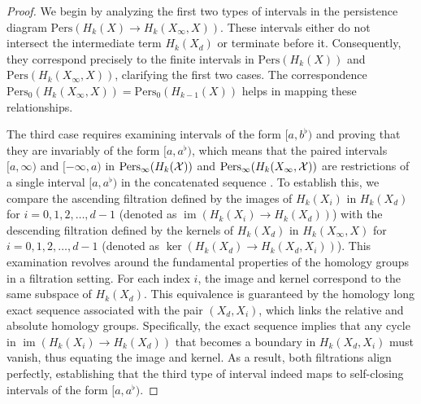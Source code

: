 \begin{proof}
	We begin by analyzing the first two types of intervals in the persistence diagram
	$\mathrm{Pers}(H_{k}(X) \to H_{k}(X_{\infty}, X))$. These intervals either do
	not intersect the intermediate term $H_{k}(X_{d})$ or terminate before it. Consequently,
	they correspond precisely to the finite intervals in $\mathrm{Pers}(H_{k}(X))$
	and $\mathrm{Pers}(H_{k}(X_{\infty}, X))$, clarifying the first two cases. The
	correspondence $\mathrm{Pers}_{0}(H_{k}(X_{\infty}, X)) = \mathrm{Pers}_{0}(H_{k-1}(X))$
	helps in mapping these relationships.

	The third case requires examining intervals of the form $[a, b^{\flat})$ and
	proving that they are invariably of the form $[a, a^{\flat})$, which means that
	the paired intervals $[a,\infty)$ and $[-\infty,a)$ in $\mathrm{Pers}_{\infty}(
	H_{k}({\mathcal{X}}))$ and $\mathrm{Pers}_{\infty}(H_{k}(X_{\infty}, {\mathcal{X}}))$ are restrictions
	of a single interval $[a,a^{\flat})$ in the concatenated sequence \cite[Proposition 2.5, proof]{de2011dualities}.
	To establish this, we compare the ascending filtration defined by the images of
	$H_{k}(X_{i})$ in $H_{k}(X_{d})$ for $i = 0, 1, 2, \ldots, d-1$ (denoted as
	$\operatorname{im}(H_{k}(X_{i}) \to H_{k}(X_{d}))$) with the descending filtration defined
	by the kernels of $H_{k}(X_{d})$ in $H_{k}(X_{\infty}, X)$ for $i = 0, 1, 2, \ldots
	, d-1$ (denoted as $\ker(H_{k}(X_{d}) \to H_{k}(X_{d}, X_{i}))$). This
	examination revolves around the fundamental properties of the homology groups
	in a filtration setting. For each index $i$, the image and kernel correspond to the same subspace of $H_{k}
	(X_{d})$. This equivalence is guaranteed by the homology long exact sequence
	associated with the pair $(X_{d}, X_{i})$, which links the relative and absolute
	homology groups. Specifically, the exact sequence implies that any cycle in $\operatorname{im}
	(H_{k}(X_{i}) \to H_{k}(X_{d}))$ that becomes a boundary in $H_{k}(X_{d}, X_{i}
	)$ must vanish, thus equating the image and kernel. As a result, both
	filtrations align perfectly, establishing that the third type of interval indeed
	maps to self-closing intervals of the form $[a, a^{\flat})$.
\end{proof}

